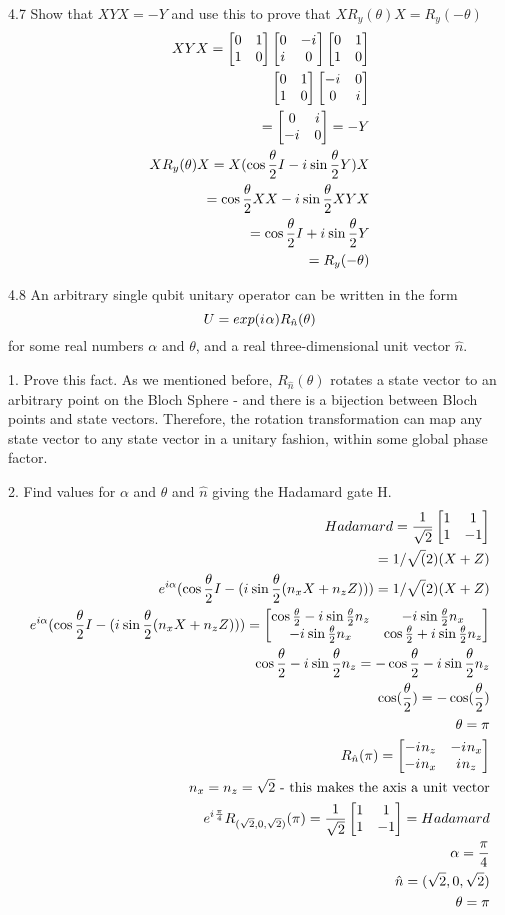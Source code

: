 \documentclass[12pt, letterpaper, twoside]{article}
\newcommand{\iu}{{i\mkern1mu}}
\newcommand{\Hadamard}{\frac{1}{\sqrt{2}}
\begin{bmatrix}
    1 & 1 \\
    1 & -1
\end{bmatrix}}
\newcommand{\halftheta}{\frac{\theta}{2}}
\newcommand{\twoXtwo}[4]{\begin{bmatrix}
    #1 & #3 \\
    #2 & #4
\end{bmatrix}}
\newcommand{\pauliX}{\twoXtwo{0}{1}{1}{0}}
\newcommand{\pauliY}{\twoXtwo{0}{\iu}{-\iu}{0}}
\begin{document}
4.7 Show that $XYX = -Y$ and use this to prove that $X R_y(\theta)X = R_y(-\theta)$
\begin{subequations}
\begin{align}
XYX = \pauliX\pauliY\pauliX\\
\pauliX\twoXtwo{-\iu}{0}{0}{\iu}\\
= \twoXtwo{0}{-\iu}{\iu}{0} = -Y\\
XR_y(\theta)X = X(\cos{\halftheta}I - \iu \sin{\halftheta}Y)X\\
= \cos{\halftheta}XX - \iu \sin{\halftheta}XYX\\
= \cos{\halftheta}I +\iu \sin{\halftheta}Y\\
= R_y(-\theta)
\end{align}
\end{subequations}

4.8 An arbitrary single qubit unitary operator can be written in the form
$$
U = exp(\iu \alpha)R_{\hat{n}}(\theta)
$$
for some real numbers $\alpha$ and $\theta$, and a real three-dimensional unit vector $\hat{n}$.

1. Prove this fact.
As we mentioned before, $R_{\hat{n}}(\theta)$ rotates a state vector to an arbitrary point on the Bloch Sphere - and there is a bijection between Bloch points and state vectors. Therefore, the rotation transformation can map any state vector to any state vector in a unitary fashion, within some global phase factor.

2. Find values for $\alpha$ and $\theta$ and $\hat{n}$ giving the Hadamard gate H.
\begin{subequations}
\begin{align}
Hadamard = \Hadamard \\
= 1/\sqrt(2) (X + Z) \\
e^{i \alpha}(\cos{\halftheta}I - (\iu \sin{\halftheta}(n_x X + n_z Z))) = 1/\sqrt(2) (X + Z) \\
e^{i \alpha}(\cos{\halftheta}I - (\iu \sin{\halftheta}(n_x X + n_z Z))) = \twoXtwo{\cos{\halftheta} - \iu \sin{\halftheta} n_z}{-\iu \sin{\halftheta} n_x}{-\iu \sin{\halftheta} n_x}{\cos{\halftheta} + \iu \sin{\halftheta} n_z} \\
\cos{\halftheta} - \iu \sin{\halftheta} n_z = -\cos{\halftheta} - \iu \sin{\halftheta} n_z \\
\cos(\halftheta) = - \cos(\halftheta) \\
\theta = \pi \\
R_{\hat{n}}(\pi) = \twoXtwo{- \iu n_z}{-\iu n_x}{-\iu n_x}{\iu n_z} \\
n_x = n_z = \sqrt{2} \text{ - this makes the axis a unit vector} \\
e^{\iu\frac{\pi}{4}} R_{(\sqrt{2}, 0, \sqrt{2})}(\pi) = \Hadamard = Hadamard \\
\alpha = \frac{\pi}{4} \\ \hat{n} = (\sqrt{2}, 0, \sqrt{2}) \\ \theta = \pi
\end{align}
\end{subequations}
\end{document}
